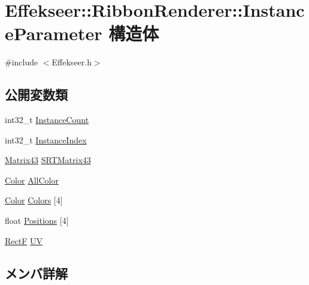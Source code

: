 \hypertarget{struct_effekseer_1_1_ribbon_renderer_1_1_instance_parameter}{}\section{Effekseer\+:\+:Ribbon\+Renderer\+:\+:Instance\+Parameter 構造体}
\label{struct_effekseer_1_1_ribbon_renderer_1_1_instance_parameter}


{\ttfamily \#include $<$Effekseer.\+h$>$}

\subsection*{公開変数類}
\begin{DoxyCompactItemize}
\item 
int32\+\_\+t \mbox{\hyperlink{struct_effekseer_1_1_ribbon_renderer_1_1_instance_parameter_a2af6b88f0a8ed75b33fed94f38934353}{Instance\+Count}}
\item 
int32\+\_\+t \mbox{\hyperlink{struct_effekseer_1_1_ribbon_renderer_1_1_instance_parameter_a39fb064c24fef06eee1c4deaad15e027}{Instance\+Index}}
\item 
\mbox{\hyperlink{struct_effekseer_1_1_matrix43}{Matrix43}} \mbox{\hyperlink{struct_effekseer_1_1_ribbon_renderer_1_1_instance_parameter_afc0524469889f23dec49ef302aa44c2b}{S\+R\+T\+Matrix43}}
\item 
\mbox{\hyperlink{struct_effekseer_1_1_color}{Color}} \mbox{\hyperlink{struct_effekseer_1_1_ribbon_renderer_1_1_instance_parameter_a87e802bfc8b166a32fef0b4971807a41}{All\+Color}}
\item 
\mbox{\hyperlink{struct_effekseer_1_1_color}{Color}} \mbox{\hyperlink{struct_effekseer_1_1_ribbon_renderer_1_1_instance_parameter_a4af0c70d517d18d09821b4dc04debbe5}{Colors}} \mbox{[}4\mbox{]}
\item 
float \mbox{\hyperlink{struct_effekseer_1_1_ribbon_renderer_1_1_instance_parameter_a1afec647ad8491d42678acc2e826c93a}{Positions}} \mbox{[}4\mbox{]}
\item 
\mbox{\hyperlink{struct_effekseer_1_1_rect_f}{RectF}} \mbox{\hyperlink{struct_effekseer_1_1_ribbon_renderer_1_1_instance_parameter_ae15daebe5ddca6f33083976153344531}{UV}}
\end{DoxyCompactItemize}


\subsection{メンバ詳解}
\mbox{\label{struct_effekseer_1_1_ribbon_renderer_1_1_instance_parameter_a87e802bfc8b166a32fef0b4971807a41}} 
